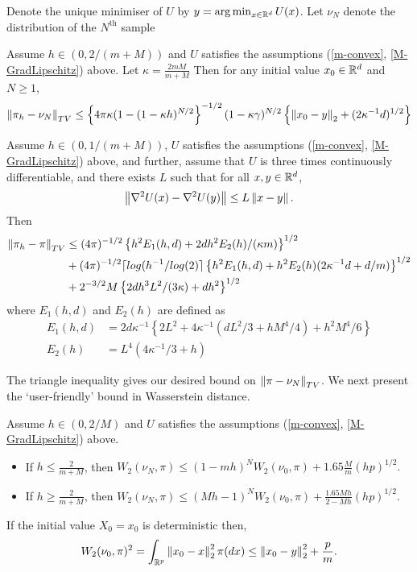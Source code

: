 Denote the unique minimiser of $U$ by $y=\arg \min_{x \in \mathbb{R}^d} U(x)$.  Let $\nu_N$ denote the distribution of the $N^{\text{th}}$ sample

\begin{theorem}
    Assume $h \in (0, 2/(m+M))$ and $U$ satisfies the assumptions (\ref{m-convex}, \ref{M-GradLipschitz}) above.  Let $\kappa = \frac{2mM}{m+M}$  Then for any initial value $x_0 \in \mathbb{R}^d$ and $N \geq 1$,
    $$
    \norm{\pi_h - \nu_N}_{TV} \leq \left\{ 4 \pi \kappa (1-(1-\kappa h)^{N/2} \right\}^{-1/2} (1-\kappa \gamma)^{N/2} \left\{ \norm{x_0 - y}_2 + (2 \kappa^{-1}d)^{1/2} \right\}
    $$
\end{theorem}

\begin{theorem}
    Assume $h \in (0, 1/(m+M))$, $U$ satisfies the assumptions (\ref{m-convex}, \ref{M-GradLipschitz}) above, and further, assume that $U$ is three times continuously differentiable, and there exists $L$ such that for all $x,y \in \mathbb{R}^d$,
    $$
    \norm{\grad^2 U(x) - \grad^2 U(y)} \leq L \norm{x-y}.
    $$
    Then
    \begin{align*}
        \norm{\pi_h - \pi}_{TV} &\leq (4 \pi)^{-1/2} \left\{ h^2 E_1(h, d) + 2dh^2 E_2(h)/(\kappa m)\right\}^{1/2}\\
        &+ (4 \pi)^{-1/2} \lceil log(h^{-1}/log(2) \rceil \left\{ h^2 E_1(h,d) + h^2 E_2(h)(2 \kappa^{-1}d + d/m) \right\}^{1/2}\\
        &+ 2^{-3/2} M \left\{ 2d h^3 L^2/(3\kappa) + dh^2\right\}^{1/2}
    \end{align*}
    where $E_1(h,d)$ and $E_2(h)$ are defined as
    \begin{align*}
        E_1(h,d) &= 2 d \kappa^{-1} \left\{2L^2 + 4 \kappa^{-1} (dL^2/3 + h M^4 /4) + h^2 M^4/6 \right\}\\
        E_2(h) &= L^4(4\kappa^{-1}/3 + h)
    \end{align*}
\end{theorem}

The triangle inequality gives our desired bound on $\norm{\pi - \nu_N}_{TV}$.  We next present the `user-friendly' bound in Wasserstein distance.

\begin{theorem}
    Assume $h \in (0, 2/M)$ and $U$ satisfies the assumptions (\ref{m-convex}, \ref{M-GradLipschitz}) above. 
    \begin{itemize}
        \item If $h \leq \frac{2}{m+M}$, then $W_2(\nu_N, \pi) \leq (1-mh)^N W_2(\nu_0, \pi) + 1.65 \frac{M}{m}(hp)^{1/2}.$
        \item If $h \geq \frac{2}{m+M}$, then $W_2(\nu_N, \pi) \leq (Mh-1)^N W_2(\nu_0, \pi) + \frac{1.65Mh}{2-Mh}(hp)^{1/2}.$
\end{itemize}
\end{theorem}
\begin{prop}
    If the initial value $X_0 = x_0$ is deterministic then,
    $$
    W_2(\nu_0, \pi)^2 = \int_{\R^p} \norm{x_0-x}_2^2 \pi(dx) \leq \norm{x_0-y}_2^2 + \frac{p}{m}.
    $$
\end{prop}

